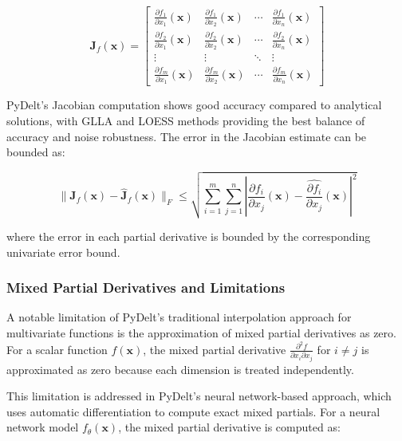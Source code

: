 \documentclass[10pt,journal,compsoc]{IEEEtran}
\begin{document}
\begin{equation}
    \mathbf{J}_f(\mathbf{x}) = \begin{bmatrix}
    \frac{\partial f_1}{\partial x_1}(\mathbf{x}) & \frac{\partial f_1}{\partial x_2}(\mathbf{x}) & \cdots & \frac{\partial f_1}{\partial x_n}(\mathbf{x}) \\
    \frac{\partial f_2}{\partial x_1}(\mathbf{x}) & \frac{\partial f_2}{\partial x_2}(\mathbf{x}) & \cdots & \frac{\partial f_2}{\partial x_n}(\mathbf{x}) \\
    \vdots & \vdots & \ddots & \vdots \\
    \frac{\partial f_m}{\partial x_1}(\mathbf{x}) & \frac{\partial f_m}{\partial x_2}(\mathbf{x}) & \cdots & \frac{\partial f_m}{\partial x_n}(\mathbf{x})
    \end{bmatrix}
\end{equation}

PyDelt's Jacobian computation shows good accuracy compared to analytical solutions, with GLLA and LOESS methods providing the best balance of accuracy and noise robustness. The error in the Jacobian estimate can be bounded as:

\begin{equation}
    \|\mathbf{J}_f(\mathbf{x}) - \hat{\mathbf{J}}_f(\mathbf{x})\|_F \leq \sqrt{\sum_{i=1}^{m}\sum_{j=1}^{n} \left|\frac{\partial f_i}{\partial x_j}(\mathbf{x}) - \hat{\frac{\partial f_i}{\partial x_j}}(\mathbf{x})\right|^2}
\end{equation}

where the error in each partial derivative is bounded by the corresponding univariate error bound.

\subsubsection{Mixed Partial Derivatives and Limitations}

A notable limitation of PyDelt's traditional interpolation approach for multivariate functions is the approximation of mixed partial derivatives as zero. For a scalar function $f(\mathbf{x})$, the mixed partial derivative $\frac{\partial^2 f}{\partial x_i \partial x_j}$ for $i \neq j$ is approximated as zero because each dimension is treated independently.

This limitation is addressed in PyDelt's neural network-based approach, which uses automatic differentiation to compute exact mixed partials. For a neural network model $f_{\theta}(\mathbf{x})$, the mixed partial derivative is computed as:
\end{document}
